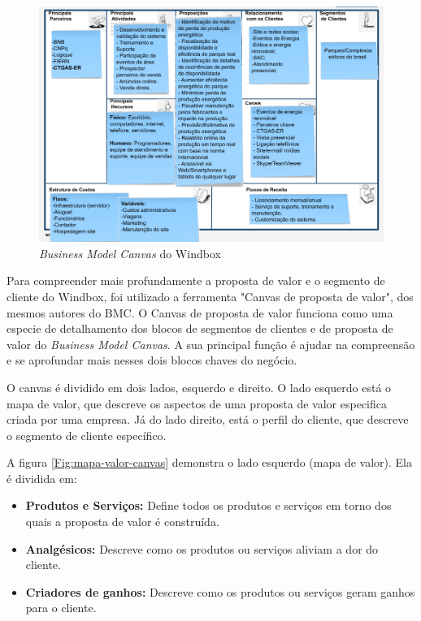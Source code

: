 \begin{figure}[htbp!] \begin{center}
\includegraphics[width=1\linewidth]{./figuras/BMG}
\caption{\textit{Business Model Canvas} do Windbox}
\label{Fig:bmc-windbox}
\end{center} 
\end{figure}

Para compreender mais profundamente a proposta de valor e o segmento de cliente do Windbox, foi utilizado a ferramenta "Canvas de proposta de valor", dos mesmos autores do BMC. O Canvas de proposta de valor funciona como uma especie de detalhamento dos blocos de segmentos de clientes e de proposta de valor do \textit{Business Model Canvas}. A sua principal função é ajudar na compreensão e se aprofundar mais nesses dois blocos chaves do negócio.

O canvas é dividido em dois lados, esquerdo e direito. O lado esquerdo está o mapa de valor, que descreve os aspectos de uma proposta de valor especifica criada por uma empresa. Já do lado direito, está o perfil do cliente, que descreve o segmento de cliente específico.

A figura \ref{Fig:mapa-valor-canvas} demonstra o lado esquerdo (mapa de valor). Ela é dividida em:
\begin{itemize}
    \item \textbf{Produtos e Serviços:} Define todos os produtos e serviços em torno dos quais a proposta de valor é construída.
    \item \textbf{Analgésicos:} Descreve como os produtos ou serviços aliviam a dor do cliente.
    \item \textbf{Criadores de ganhos:} Descreve como os produtos ou serviços geram ganhos para o cliente.
\end{itemize}


